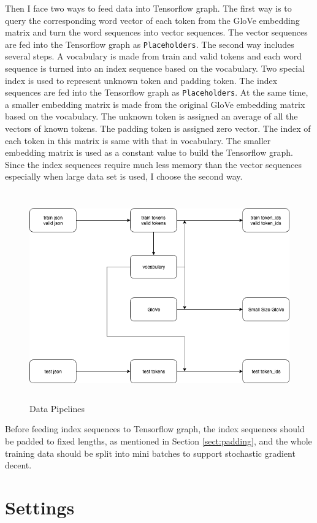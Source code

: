 \documentclass[modernstyle,12pt]{sjsuthesis}
\theoremstyle{definition}
\begin{document}
Then I face two ways to feed data into Tensorflow graph. The first way is to query the corresponding word vector of each token from the GloVe embedding matrix and turn the word sequences into vector sequences. The vector sequences are fed into the Tensorflow graph as {\tt Placeholders}. The second way includes several steps. A vocabulary is made from train and valid tokens and each word sequence is turned into an index sequence based on the vocabulary. Two special index is used to represent unknown token and padding token. The index sequences are fed into the Tensorflow graph as {\tt Placeholders}. At the same time, a smaller embedding matrix is made from the original GloVe embedding matrix based on the vocabulary. The unknown token is assigned an average of all the vectors of known tokens. The padding token is assigned zero vector. The index of each token in this matrix is same with that in vocabulary. The smaller embedding matrix is used as a constant value to build the Tensorflow graph. Since the index sequences require much less memory than the vector sequences especially when large data set is used, I choose the second way.

\begin{figure}[htbp]\centering
  \includegraphics[width=12cm, height=9cm]{figures/data.png}
  \caption{Data Pipelines}
  \label{f:data}
\end{figure}

Before feeding index sequences to Tensorflow graph, the index sequences should be padded to fixed lengths, as mentioned in Section \ref{sect:padding}, and the whole training data should be split into mini batches to support stochastic gradient decent.


\section{Settings}
\end{document}
